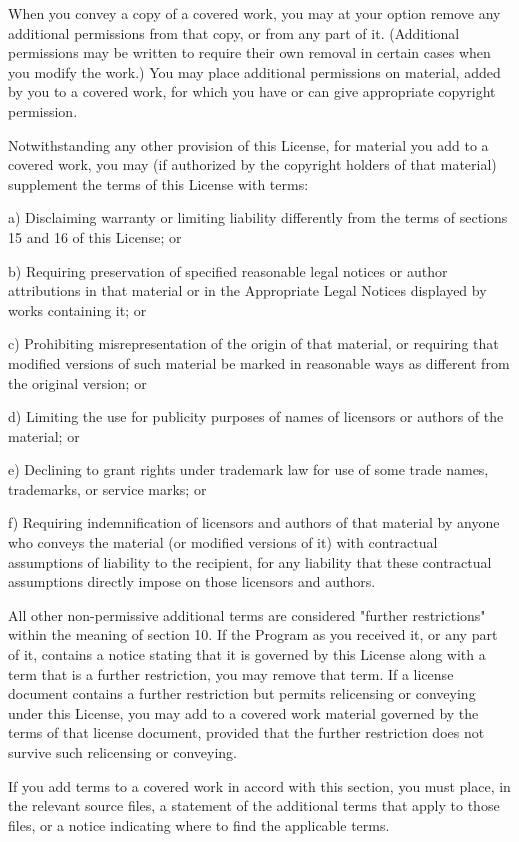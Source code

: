 When you convey a copy of a covered work, you may at your option
remove any additional permissions from that copy, or from any part of
it.  (Additional permissions may be written to require their own
removal in certain cases when you modify the work.)  You may place
additional permissions on material, added by you to a covered work,
for which you have or can give appropriate copyright permission.

Notwithstanding any other provision of this License, for material you
add to a covered work, you may (if authorized by the copyright holders of
that material) supplement the terms of this License with terms:

a) Disclaiming warranty or limiting liability differently from the
terms of sections 15 and 16 of this License; or

b) Requiring preservation of specified reasonable legal notices or
author attributions in that material or in the Appropriate Legal
Notices displayed by works containing it; or

c) Prohibiting misrepresentation of the origin of that material, or
requiring that modified versions of such material be marked in
reasonable ways as different from the original version; or

d) Limiting the use for publicity purposes of names of licensors or
authors of the material; or

e) Declining to grant rights under trademark law for use of some
trade names, trademarks, or service marks; or

f) Requiring indemnification of licensors and authors of that
material by anyone who conveys the material (or modified versions of
it) with contractual assumptions of liability to the recipient, for
any liability that these contractual assumptions directly impose on
those licensors and authors.

All other non-permissive additional terms are considered "further
restrictions" within the meaning of section 10.  If the Program as you
received it, or any part of it, contains a notice stating that it is
governed by this License along with a term that is a further
restriction, you may remove that term.  If a license document contains
a further restriction but permits relicensing or conveying under this
License, you may add to a covered work material governed by the terms
of that license document, provided that the further restriction does
not survive such relicensing or conveying.

If you add terms to a covered work in accord with this section, you
must place, in the relevant source files, a statement of the
additional terms that apply to those files, or a notice indicating
where to find the applicable terms.

